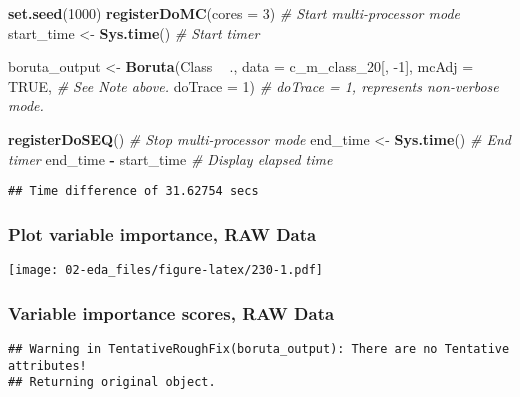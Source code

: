 \documentclass[]{article}
\newenvironment{Shaded}{\begin{snugshade}}{\end{snugshade}}
\newcommand{\CommentTok}[1]{\textcolor[rgb]{0.56,0.35,0.01}{\textit{#1}}}
\newcommand{\DataTypeTok}[1]{\textcolor[rgb]{0.13,0.29,0.53}{#1}}
\newcommand{\DecValTok}[1]{\textcolor[rgb]{0.00,0.00,0.81}{#1}}
\newcommand{\KeywordTok}[1]{\textcolor[rgb]{0.13,0.29,0.53}{\textbf{#1}}}
\newcommand{\NormalTok}[1]{#1}
\newcommand{\OperatorTok}[1]{\textcolor[rgb]{0.81,0.36,0.00}{\textbf{#1}}}
\newcommand{\OtherTok}[1]{\textcolor[rgb]{0.56,0.35,0.01}{#1}}
\newcommand{\StringTok}[1]{\textcolor[rgb]{0.31,0.60,0.02}{#1}}
\begin{document}
\begin{Shaded}
\begin{Highlighting}[]
\KeywordTok{set.seed}\NormalTok{(}\DecValTok{1000}\NormalTok{)}
\KeywordTok{registerDoMC}\NormalTok{(}\DataTypeTok{cores =} \DecValTok{3}\NormalTok{) }\CommentTok{# Start multi-processor mode}
\NormalTok{start_time <-}\StringTok{ }\KeywordTok{Sys.time}\NormalTok{() }\CommentTok{# Start timer}

\NormalTok{boruta_output <-}\StringTok{ }\KeywordTok{Boruta}\NormalTok{(Class }\OperatorTok{~}\StringTok{ }\NormalTok{.,}
                        \DataTypeTok{data =}\NormalTok{ c_m_class_}\DecValTok{20}\NormalTok{[, }\DecValTok{-1}\NormalTok{],}
                        \DataTypeTok{mcAdj =} \OtherTok{TRUE}\NormalTok{, }\CommentTok{# See Note above.}
                        \DataTypeTok{doTrace =} \DecValTok{1}\NormalTok{) }\CommentTok{# doTrace = 1, represents non-verbose mode.}

\KeywordTok{registerDoSEQ}\NormalTok{() }\CommentTok{# Stop multi-processor mode}
\NormalTok{end_time <-}\StringTok{ }\KeywordTok{Sys.time}\NormalTok{() }\CommentTok{# End timer}
\NormalTok{end_time }\OperatorTok{-}\StringTok{ }\NormalTok{start_time }\CommentTok{# Display elapsed time}
\end{Highlighting}
\end{Shaded}

\begin{verbatim}
## Time difference of 31.62754 secs
\end{verbatim}

\hypertarget{plot-variable-importance-raw-data}{%
\subsubsection{Plot variable importance, RAW
Data}\label{plot-variable-importance-raw-data}}

\texttt{[image: 02-eda\_files/figure-latex/230-1.pdf]}

\hypertarget{variable-importance-scores-raw-data}{%
\subsubsection{Variable importance scores, RAW
Data}\label{variable-importance-scores-raw-data}}

\begin{verbatim}
## Warning in TentativeRoughFix(boruta_output): There are no Tentative attributes!
## Returning original object.
\end{verbatim}
\end{document}
